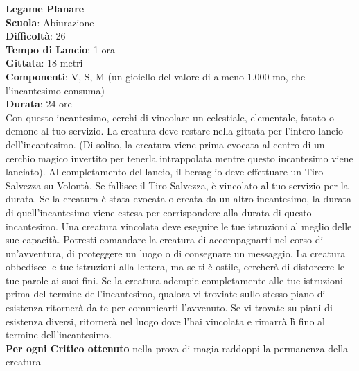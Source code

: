 \begin{multicols}{2}
\medskip\textbf{Legame Planare}\\
\textbf{Scuola}: Abiurazione\\
\textbf{Difficoltà}: 26\\
\textbf{Tempo di Lancio}: 1 ora\\
\textbf{Gittata}: 18 metri\\
\textbf{Componenti}: V, S, M (un gioiello del valore di almeno 1.000 mo, che l'incantesimo consuma)\\
\textbf{Durata}: 24 ore\\
Con questo incantesimo, cerchi di vincolare un celestiale, elementale, fatato o demone al tuo servizio. La creatura deve restare nella gittata per l'intero lancio dell'incantesimo. (Di solito, la creatura viene prima evocata al centro di un cerchio magico invertito per tenerla intrappolata mentre questo incantesimo viene lanciato). Al completamento del lancio, il bersaglio deve effettuare un Tiro Salvezza su Volontà. Se fallisce il Tiro Salvezza, è vincolato al tuo servizio per la durata. Se la creatura è stata evocata o creata da un altro incantesimo, la durata di quell'incantesimo viene estesa per corrispondere alla durata di questo incantesimo. Una creatura vincolata deve eseguire le tue istruzioni al meglio delle sue capacità. Potresti comandare la creatura di accompagnarti nel corso di un'avventura, di proteggere un luogo o di consegnare un messaggio. La creatura obbedisce le tue istruzioni alla lettera, ma se ti è ostile, cercherà di distorcere le tue parole ai suoi fini. Se la creatura adempie completamente alle tue istruzioni prima del termine dell'incantesimo, qualora vi troviate sullo stesso piano di esistenza ritornerà da te per comunicarti l'avvenuto. Se vi trovate su piani di esistenza diversi, ritornerà nel luogo dove l'hai vincolata e rimarrà lì fino al termine dell'incantesimo.\\
\textbf{Per ogni Critico ottenuto} nella prova di magia raddoppi la permanenza della creatura


\end{multicols}

